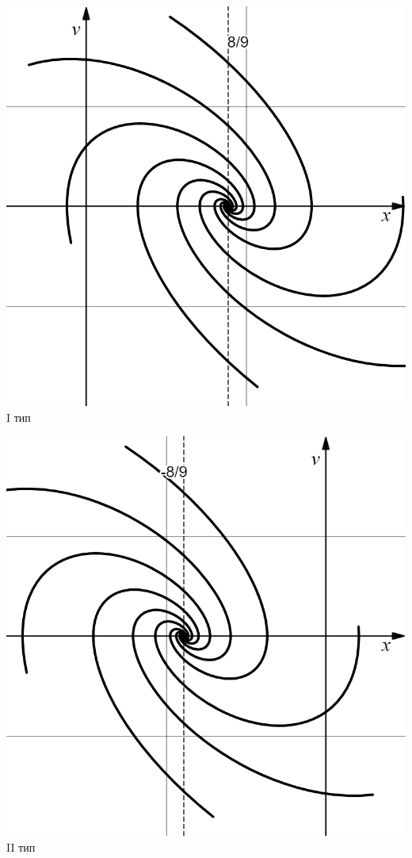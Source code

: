 	
	\noindent\begin{minipage}{.5\textwidth}
		\includegraphics[width=\textwidth]{png/траектории1.png}
		\centering I тип
	\end{minipage}
	\begin{minipage}{.5\textwidth}
		\includegraphics[width=\textwidth]{png/траектории2.png}
		\centering II тип
	\end{minipage}
	\label{tracks}


